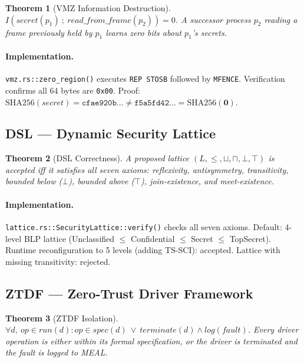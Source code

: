 \documentclass[10pt,twocolumn]{article}
\newtheorem{theorem}{Theorem}
\begin{document}
\begin{theorem}[VMZ Information Destruction]
$I(\mathit{secret}(p_1)\ ;\ \mathit{read\_from\_frame}(p_2)) = 0$.
A successor process $p_2$ reading a frame previously held by $p_1$
learns zero bits about $p_1$'s secrets.
\end{theorem}

\paragraph{Implementation.} \texttt{vmz.rs::zero\_region()} executes
\texttt{REP STOSB} followed by \texttt{MFENCE}. Verification confirms
all 64 bytes are \texttt{0x00}. Proof: $\mathrm{SHA256}(\mathit{secret})
= \texttt{cfae920b\ldots} \neq \texttt{f5a5fd42\ldots} =
\mathrm{SHA256}(\mathbf{0})$.

\subsection{DSL --- Dynamic Security Lattice}

\begin{theorem}[DSL Correctness]
A proposed lattice $(L, \leq, \sqcup, \sqcap, \bot, \top)$ is accepted
iff it satisfies all seven axioms: reflexivity, antisymmetry, transitivity,
bounded below ($\bot$), bounded above ($\top$), join-existence, and
meet-existence.
\end{theorem}

\paragraph{Implementation.} \texttt{lattice.rs::SecurityLattice::verify()}
checks all seven axioms. Default: 4-level BLP lattice (Unclassified
$\leq$ Confidential $\leq$ Secret $\leq$ TopSecret). Runtime
reconfiguration to 5 levels (adding TS-SCI): accepted. Lattice with
missing transitivity: rejected.

\subsection{ZTDF --- Zero-Trust Driver Framework}

\begin{theorem}[ZTDF Isolation]
$\forall d,\ \mathit{op} \in \mathit{run}(d):
\mathit{op} \in \mathit{spec}(d)
\ \vee\
\mathit{terminate}(d) \wedge \mathit{log}(\mathit{fault})$.
Every driver operation is either within its formal specification,
or the driver is terminated and the fault is logged to MEAL.
\end{theorem}
\end{document}
